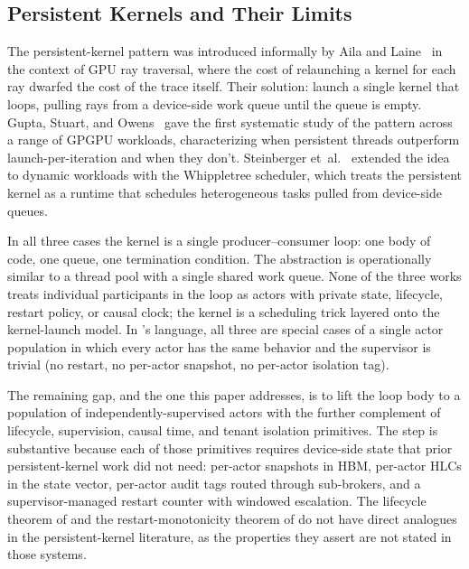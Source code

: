 \subsection{Persistent Kernels and Their Limits}
\label{sec:bg:persistent}

The persistent-kernel pattern was introduced informally by Aila and
Laine~\citep{aila2009raytrace} in the context of GPU ray traversal,
where the cost of relaunching a kernel for each ray dwarfed the
cost of the trace itself.  Their solution: launch a single kernel
that loops, pulling rays from a device-side work queue until the
queue is empty.  Gupta, Stuart, and Owens~\citep{gupta2012persistent}
gave the first systematic study of the pattern across a range of
GPGPU workloads, characterizing when persistent threads outperform
launch-per-iteration and when they don't.
Steinberger et~al.~\citep{steinberger2014whippletree} extended the
idea to dynamic workloads with the Whippletree scheduler, which
treats the persistent kernel as a runtime that schedules
heterogeneous tasks pulled from device-side queues.

In all three cases the kernel is a single producer--consumer loop:
one body of code, one queue, one termination condition.  The
abstraction is operationally similar to a thread pool with a single
shared work queue.  None of the three works treats individual
participants in the loop as actors with private state, lifecycle,
restart policy, or causal clock; the kernel is a scheduling trick
layered onto the kernel-launch model.  In \system{}'s language, all
three are special cases of a single actor population in which every
actor has the same behavior and the supervisor is trivial
(no restart, no per-actor snapshot, no per-actor isolation tag).

The remaining gap, and the one this paper addresses, is to lift
the loop body to a population of independently-supervised actors
with the further complement of lifecycle, supervision, causal time,
and tenant isolation primitives.  The step is substantive because
each of those primitives requires device-side state that prior
persistent-kernel work did not need: per-actor snapshots in HBM,
per-actor HLCs in the state vector, per-actor audit tags routed
through sub-brokers, and a supervisor-managed restart counter with
windowed escalation.  The lifecycle theorem of
 and the restart-monotonicity
theorem of  do not have direct
analogues in the persistent-kernel literature, as the properties
they assert are not stated in those systems.
